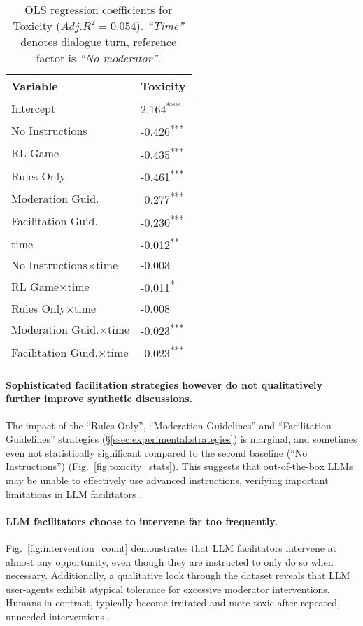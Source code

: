 \begin{table}[t]
	\centering
	\begin{tabular}{l p{2.5cm}}
		\toprule
		\textbf{Variable} & \textbf{Toxicity} \\
		\midrule
		Intercept & 2.164\textsuperscript{***} \\
		No Instructions & -0.426\textsuperscript{***} \\
		\ac{RL} Game & -0.435\textsuperscript{***} \\
		Rules Only & -0.461\textsuperscript{***} \\
		Moderation Guid. & -0.277\textsuperscript{***} \\
		Facilitation Guid. & -0.230\textsuperscript{***} \\
		time & -0.012\textsuperscript{**} \\
		No Instructions$\times$time & -0.003 \\
		\ac{RL} Game$\times$time & -0.011\textsuperscript{*} \\
		Rules Only$\times$time & -0.008 \\
		Moderation Guid.$\times$time & -0.023\textsuperscript{***} \\
		Facilitation Guid.$\times$time & -0.023\textsuperscript{***} \\
		\bottomrule
	\end{tabular}
	\small
	\asterisknote
	\normalsize
	\caption{\ac{OLS} regression coefficients for Toxicity ($Adj. R^2=0.054$). \textit{“Time”} denotes dialogue turn, reference factor is \textit{“No moderator”}.}
	\label{tab:toxicity}
\end{table}

\paragraph{Sophisticated facilitation strategies however do not qualitatively further improve synthetic discussions.} The impact of the ``Rules Only'', ``Moderation Guidelines'' and ``Facilitation Guidelines''  strategies (\S\ref{ssec:experimental:strategies}) is marginal, and sometimes even not statistically significant compared to the second baseline (``No Instructions'') (Fig.~\ref{fig:toxicity_stats}). This suggests that out-of-the-box \acp{LLM} may be unable to effectively use advanced instructions, verifying important limitations in \ac{LLM} facilitators \cite{cho-etal-2024-language}.

\paragraph{\ac{LLM} facilitators choose to intervene far too frequently.} Fig.~\ref{fig:intervention_count} demonstrates that \ac{LLM} facilitators intervene at almost any opportunity, even though they are instructed to only do so when necessary. Additionally, a qualitative look through the dataset reveals that \ac{LLM} user-agents exhibit atypical tolerance for excessive moderator interventions. Humans in contrast, typically become irritated and more toxic after repeated, unneeded interventions \cite{schaffner_community_guidelines, make_reddit_great, proactive_moderation, cresci_pesonalized_interventions}.

